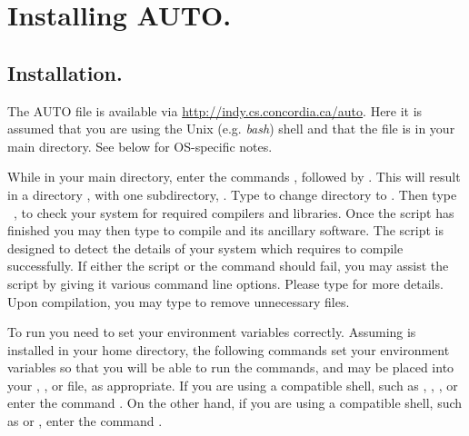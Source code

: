 \documentclass[12pt]{report}
\begin{document}
\chapter{Installing {\cal AUTO}.} \label{ch:Installing_AUTO}
\section{ Installation.} \label{sec:Installation}
The {\cal AUTO} file  is
available via \url{http://indy.cs.concordia.ca/auto}.
Here it is assumed that you are using the Unix (e.g. \emph{bash}) shell 
and that the file  is in your main
directory. See below for OS-specific notes.

While in your main directory, enter the commands
,
followed by .
This will result in a directory , 
with one subdirectory, . 
Type 
to change directory to .
Then type
~,
to check your system for required compilers and libraries.
Once the  script has finished you 
may then type  to compile \AUTO
and its ancillary software.
The  script is designed to detect the details
of your system which \AUTO requires to compile successfully.
If either the  script or the  command
should fail, you may assist the  script by giving
it various command line options.  Please type 
for more details.
Upon compilation, you may type 
to remove unnecessary files.

To run \AUTO you need to set your environment variables correctly.
Assuming \AUTO is installed in your home directory, the following
commands set your environment variables so that you will be able to
run the \AUTO commands, and may be placed into your ,
, or  file, as appropriate.  If you are
using a  compatible shell, such as ,
, , or  enter the command
.  On the
other hand, if you are using a  compatible shell, such
as  or , enter the command .
\end{document}
